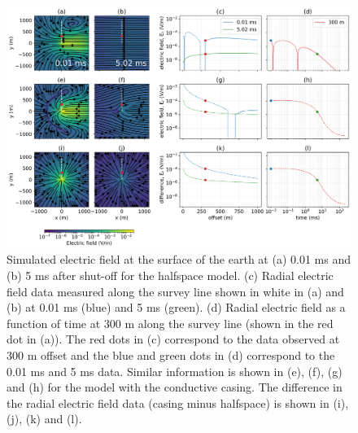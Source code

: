 \begin{figure}
    \begin{center}
    \includegraphics[width=\textwidth]{figures/em_casing/surface_e_fields_overview.png}
    \end{center}
\caption{
    Simulated electric field at the surface of the earth at (a) 0.01 ms and (b) 5 ms after shut-off for the halfspace model.
    (c) Radial electric field data measured along the survey line shown in white in (a) and (b) at 0.01 ms (blue) and 5 ms (green).
    (d) Radial electric field as a function of time at 300 m along the survey line (shown in the red dot in (a)).
    The red dots in (c) correspond to the data observed at 300 m offset
    and the blue and green dots in (d) correspond to the 0.01 ms and 5 ms data.
    Similar information is shown in (e), (f), (g) and (h) for the model with the conductive casing.
    The difference in the radial electric field data (casing minus halfspace) is shown in (i), (j), (k) and (l).
}
\label{fig:surface_e_fields_overview}
\end{figure}



